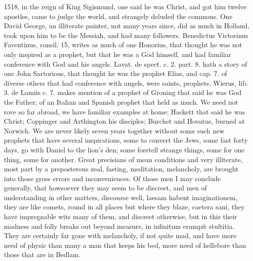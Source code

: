 {1518, in the reign of King Sigismund, one said he was Christ, and got
him twelve apostles, came to judge the world, and strangely deluded the
commons. One David George, an illiterate painter, not many years
since, did as much in Holland, took upon him to be the Messiah, and had
many followers. Benedictus Victorinus Faventinus, consil. 15, writes as
much of one Honorius, that thought he was not only inspired as a
prophet, but that he was a God himself, and had familiar
conference with God and his angels. Lavat. de spect. c. 2. part. 8.
hath a story of one John Sartorious, that thought he was the prophet
Elias, and cap. 7. of diverse others that had conference with angels,
were saints, prophets. Wierus, lib. 3. de Lamiis c. 7. makes mention of
a prophet of Groning that said he was God the Father; of an Italian and
Spanish prophet that held as much. We need not rove so far abroad, we
have familiar examples at home: Hackett that said he was Christ;
Coppinger and Arthington his disciples; Burchet and Hovatus,
burned at Norwich. We are never likely seven years together without
some such new prophets that have several inspirations, some to convert
the Jews, some fast forty days, go with Daniel to the lion's den; some
foretell strange things, some for one thing, some for another. Great
precisians of mean conditions and very illiterate, most part by a
preposterous zeal, fasting, meditation, melancholy, are brought into
those gross errors and inconveniences. Of those men I may conclude
generally, that howsoever they may seem to be discreet, and men of
understanding in other matters, discourse well, laesam habent
imaginationem, they are like comets, round in all places but where they
blaze, caetera sani, they have impregnable wits many of them, and
discreet otherwise, but in this their madness and folly breaks out
beyond measure, in infinitum erumpit stultitia. They are certainly far
gone with melancholy, if not quite mad, and have more need of physic
than many a man that keeps his bed, more need of hellebore than those
that are in Bedlam.

}
